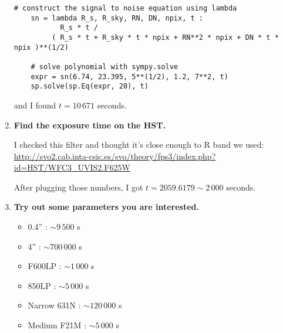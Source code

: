 \documentclass[12pt,letterpaper]{article}
\begin{document}
\begin{enumerate}
\begin{lstlisting}[style = python]
    # construct the signal to noise equation using lambda
    sn = lambda R_s, R_sky, RN, DN, npix, t : 
           R_s * t /
         ( R_s * t + R_sky * t * npix + RN**2 * npix + DN * t * npix )**(1/2)    
        
    # solve polynomial with sympy.solve
    expr = sn(6.74, 23.395, 5**(1/2), 1.2, 7**2, t)
    sp.solve(sp.Eq(expr, 20), t)
    \end{lstlisting} 

    and I found $t = 10\,671$ seconds.

    \item {\bf Find the exposure time on the HST.}
    
    I checked this filter and thought it's close enough to R band we used:
    \url{http://svo2.cab.inta-csic.es/svo/theory/fps3/index.php?id=HST/WFC3_UVIS2.F625W}
    
    After plugging those numbers, I got $t = 2059.6179 \sim 2\,000$ seconds. 
    
    \item {\bf Try out some parameters you are interested.}
    
    \begin{itemize}
        \item  0.4'' : $\sim 9\,500$ s
        \item 4''    : $\sim 700\,000$ s
        \item F600LP : $\sim 1\,000$ s
        \item 850LP  : $\sim 5\,000$ s
        \item Narrow 631N : $\sim 120\,000$ s
        \item Medium F21M : $\sim 5\,000$ s
    \end{itemize}

\end{enumerate}
\end{document}
